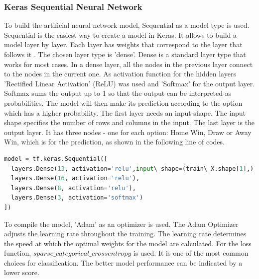 \subsubsection{Keras Sequential Neural Network}

To build the artificial neural network model, Sequential as a model type is used. Sequential is the easiest way to create a model in Keras. It allows to build a model layer by layer. Each layer has weights that correspond to the layer that follows it \cite{buildingDLModel}.\newline
The chosen layer type is 'dense'. Dense is a standard layer type that works for most cases. In a dense layer, all the nodes in the previous layer connect to the nodes in the current one.\newline
As activation function for the hidden layers 'Rectified Linear Activation' (ReLU) was used and 'Softmax' for the output layer. Softmax sums the output up to 1 so that the output can be interpreted as probabilities. The model will then make its prediction according to the option which has a higher probability.\newline \newline
The first layer needs an input shape. The input shape specifies the number of rows and columns in the input.\newline
The last layer is the output layer. It has three nodes - one for each option: Home Win, Draw or Away Win, which is for the prediction, as shown in the following line of codes.\newline \newline
\begin{lstlisting}[language=Python, caption=Python code for simple Keras Sequantial Model Instantiation]
model = tf.keras.Sequential([ 
  layers.Dense(13, activation='relu',input\_shape=(train\_X.shape[1],)), 
  layers.Dense(16, activation='relu'),
  layers.Dense(8, activation='relu'),
  layers.Dense(3, activation='softmax')
])
\end{lstlisting}
To compile the model, 'Adam' as an optimizer is used. The Adam Optimizer adjusts the learning rate throughout the training.\newline
The learning rate determines the speed at which the optimal weights for the model are calculated.\newline
For the loss function, $sparse\_categorical\_crossentropy$ is used. It is one of the most common choices for classification. The better model performance can be indicated by a lower score.\newline \newline
